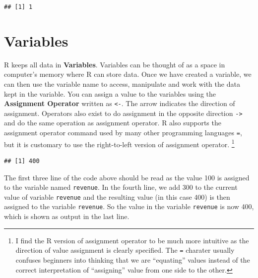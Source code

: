 \documentclass[]{krantz}
\makeatletter
\newenvironment{Shaded}{\begin{snugshade}}{\end{snugshade}}
\newcommand{\KeywordTok}[1]{\textcolor[rgb]{0.27,0.27,0.27}{\textbf{#1}}}
\newcommand{\DecValTok}[1]{\textcolor[rgb]{0.06,0.06,0.06}{#1}}
\newcommand{\StringTok}[1]{\textcolor[rgb]{0.5,0.5,0.5}{#1}}
\newcommand{\CommentTok}[1]{\textcolor[rgb]{0.37,0.37,0.37}{\textit{#1}}}
\newcommand{\OperatorTok}[1]{\textcolor[rgb]{0.43,0.43,0.43}{\textbf{#1}}}
\newcommand{\NormalTok}[1]{#1}
\newenvironment{kframe}{%
\medskip{}
\setlength{\fboxsep}{.8em}
 \def\at@end@of@kframe{}%
 \ifinner\ifhmode%
  \def\at@end@of@kframe{\end{minipage}}%
  \begin{minipage}{\columnwidth}%
 \fi\fi%
 \def\FrameCommand##1{\hskip\@totalleftmargin \hskip-\fboxsep
 \colorbox{shadecolor}{##1}\hskip-\fboxsep
     \hskip-\linewidth \hskip-\@totalleftmargin \hskip\columnwidth}%
 \MakeFramed {\advance\hsize-\width
   \@totalleftmargin\z@ \linewidth\hsize
   \@setminipage}}%
 {\par\unskip\endMakeFramed%
 \at@end@of@kframe}
\renewenvironment{Shaded}{\begin{kframe}}{\end{kframe}}
\makeatother
\begin{document}
\begin{verbatim}
## [1] 1
\end{verbatim}

\section{Variables}\label{variables}

R keeps all data in \textbf{Variables}. Variables can be thought of as a
space in computer's memory where R can store data. Once we have created
a variable, we can then use the variable name to access, manipulate and
work with the data kept in the variable. You can assign a value to the
variables using the \textbf{Assignment Operator} written as
\texttt{\textless{}-}. The arrow indicates the direction of assignment.
Operators also exist to do assignment in the opposite direction
\texttt{-\textgreater{}} and do the same operation as assignment
operator. R also supports the assignment operator command used by many
other programming languages \texttt{=}, but it is customary to use the
right-to-left version of assignment operator. \footnote{I find the R
  version of assignment operator to be much more intuitive as the
  direction of value assignment is clearly specified. The \texttt{=}
  charater usually confuses beginners into thinking that we are
  ``equating'' values instead of the correct interpretation of
  ``assigning'' value from one side to the other.}

\begin{Shaded}
\end{Shaded}

\begin{verbatim}
## [1] 400
\end{verbatim}

The first three line of the code above should be read as the value 100
is assigned to the variable named \texttt{revenue}. In the fourth line,
we add 300 to the current value of variable \texttt{revenue} and the
resulting value (in this case 400) is then assigned to the variable
\texttt{revenue}. So the value in the variable \texttt{revenue} is now
400, which is shown as output in the last line.
\end{document}
